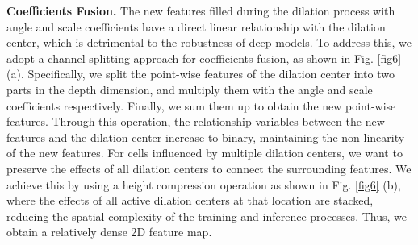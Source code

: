\textbf{Coefficients Fusion.} The new features filled during the dilation process with angle and scale coefficients have a direct linear relationship with the dilation center, which is detrimental to the robustness of deep models. To address this, we adopt a channel-splitting approach for coefficients fusion, as shown in Fig. \ref{fig6} (a). Specifically, we split the point-wise features of the dilation center into two parts in the depth dimension, and multiply them with the angle and scale coefficients respectively. Finally, we sum them up to obtain the new point-wise features. Through this operation, the relationship variables between the new features and the dilation center increase to binary, maintaining the non-linearity of the new features. For cells influenced by multiple dilation centers, we want to preserve the effects of all dilation centers to connect the surrounding features. We achieve this by using a height compression operation as shown in Fig. \ref{fig6} (b), where the effects of all active dilation centers at that location are stacked, reducing the spatial complexity of the training and inference processes. Thus, we obtain a relatively dense 2D feature map.